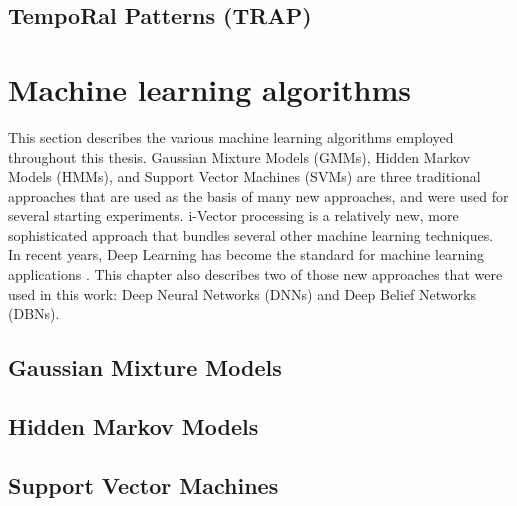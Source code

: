 \subsection{TempoRal Patterns (TRAP)}

\section{Machine learning algorithms}
This section describes the various machine learning algorithms employed throughout this thesis. Gaussian Mixture Models (GMMs), Hidden Markov Models (HMMs), and Support Vector Machines (SVMs) are three traditional approaches that are used as the basis of many new approaches, and were used for several starting experiments. i-Vector processing is a relatively new, more sophisticated approach that bundles several other machine learning techniques.\\
In recent years, Deep Learning has become the standard for machine learning applications \cite{}. This chapter also describes two of those new approaches that were used in this work: Deep Neural Networks (DNNs) and Deep Belief Networks (DBNs).

\subsection{Gaussian Mixture Models}
\subsection{Hidden Markov Models}
\subsection{Support Vector Machines}
